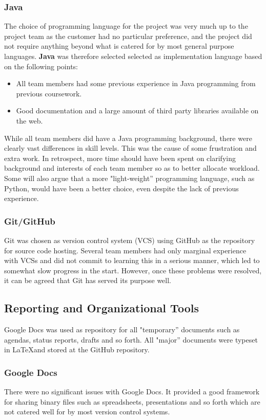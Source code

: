 \subsubsection{Java}
The choice of programming language for the project was very much up to the
project team as the customer had no particular preference, and the
project did not require anything beyond what is catered for by most
general purpose languages. \textbf{Java} was therefore selected 
selected as implementation language based on the following points:

\begin{itemize}
\item All team members had some previous experience in Java
  programming from previous coursework.
\item Good documentation and a large amount of third party libraries
  available on the web.
\end{itemize}

While all team members did have a Java programming background, there
were clearly vast differences in skill levels. This was the cause of
some frustration and extra work. In retrospect, more time should have been spent
on clarifying background and interests of each team member so as to
better allocate workload. Some will also argue that a more
"light-weight'' programming language, such as Python, would have been a
better choice, even despite the lack of previous experience.

\subsubsection{Git/GitHub}
Git was chosen as version control system (VCS) using GitHub as 
the repository for source code hosting. Several team members had only marginal experience with
VCSs and did not commit to learning this in a serious manner, which
led to somewhat slow progress in the start. However, once these problems
were resolved, it can be agreed that Git has served its purpose well.


\subsection{Reporting and Organizational Tools}
Google Docs was used as repository for all "temporary'' documents such
as agendas, status reports, drafts and so forth. All "major''
documents were typeset in \LaTeX and stored at the GitHub repository.

\subsubsection{Google Docs}
There were no significant issues with Google Docs. It provided a good
framework for sharing binary files such as spreadsheets, presentations and so forth which
are not catered well for by most version control systems.



